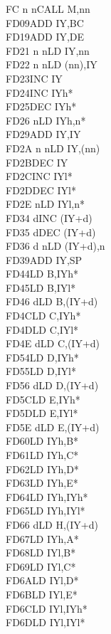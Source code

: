 \documentclass[oneside,a4paper]{book}
\begin{document}
\begin{multicols}{3}
{\begin{tabbing}
FC n n\>CALL M,nn\\
FD09\>ADD IY,BC\\
FD19\>ADD IY,DE\\
FD21 n n\>LD IY,nn\\
FD22 n n\>LD (nn),IY\\
FD23\>INC IY\\
FD24\>INC IYh*\\
FD25\>DEC IYh*\\
FD26 n\>LD IYh,n*\\
FD29\>ADD IY,IY\\
FD2A n n\>LD IY,(nn)\\
FD2B\>DEC IY\\
FD2C\>INC IYl*\\
FD2D\>DEC IYl*\\
FD2E n\>LD IYl,n*\\
FD34 d\>INC (IY+d)\\
FD35 d\>DEC (IY+d)\\
FD36 d n\>LD (IY+d),n\\
FD39\>ADD IY,SP\\
FD44\>LD B,IYh*\\
FD45\>LD B,IYl*\\
FD46 d\>LD B,(IY+d)\\
FD4C\>LD C,IYh*\\
FD4D\>LD C,IYl*\\
FD4E d\>LD C,(IY+d)\\
FD54\>LD D,IYh*\\
FD55\>LD D,IYl*\\
FD56 d\>LD D,(IY+d)\\
FD5C\>LD E,IYh*\\
FD5D\>LD E,IYl*\\
FD5E d\>LD E,(IY+d)\\
FD60\>LD IYh,B*\\
FD61\>LD IYh,C*\\
FD62\>LD IYh,D*\\
FD63\>LD IYh,E*\\
FD64\>LD IYh,IYh*\\
FD65\>LD IYh,IYl*\\
FD66 d\>LD H,(IY+d)\\
FD67\>LD IYh,A*\\
FD68\>LD IYl,B*\\
FD69\>LD IYl,C*\\
FD6A\>LD IYl,D*\\
FD6B\>LD IYl,E*\\
FD6C\>LD IYl,IYh*\\
FD6D\>LD IYl,IYl*\\

\end{tabbing}}
\end{multicols}
\end{document}
